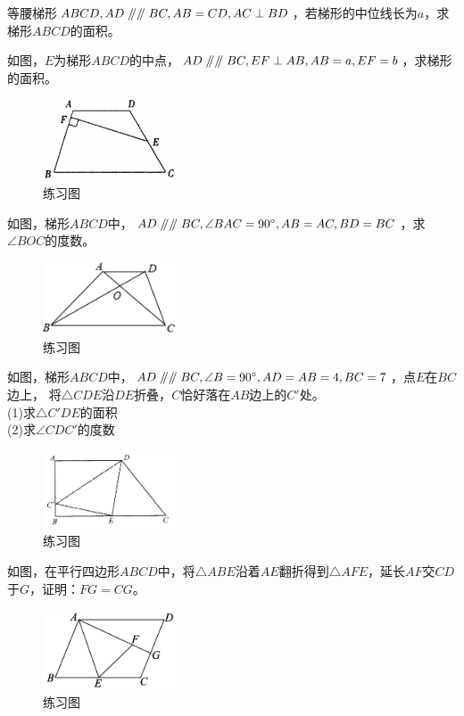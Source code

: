 \documentclass{ecnuthesis}
\newcommand\px{\mathrel{/\mkern-5mu/}}  %
\begin{document}
\begin{problem}
    等腰梯形$ABCD,AD\px \px BC,AB=CD,AC\perp BD$，若梯形的中位线长为$a$，求梯形$ABCD$的面积。
\end{problem}
\begin{problem}
    如图，$E$为梯形$ABCD$的中点，$AD\px \px BC,EF\perp AB,AB=a,EF=b$，求梯形的面积。
\end{problem}
\begin{figure}[H]
\centering
\includegraphics[width=4cm]{picture/629.png}
\caption{练习图}
\end{figure}
\begin{problem}
    如图，梯形$ABCD$中，$AD\px\px BC,\angle BAC=90^\circ,AB=AC,BD=BC$，求$\angle BOC$的度数。
\end{problem}
\begin{figure}[H]
\centering
\includegraphics[width=4cm]{picture/636.png}
\caption{练习图}
\end{figure}
\begin{problem}
    如图，梯形$ABCD$中，$AD\px\px BC,\angle B=90^\circ,AD=AB=4,BC=7$，点$E$在$BC$边上，
    将$\triangle CDE$沿$DE$折叠，$C$恰好落在$AB$边上的$C'$处。 \\
    (1)求$\triangle C'DE$的面积 \\
    (2)求$\angle CDC'$的度数 \\
\end{problem}
\begin{figure}[H]
\centering
\includegraphics[width=4cm]{picture/637.png}
\caption{练习图}
\end{figure}

\begin{problem}
    如图，在平行四边形$ABCD$中，将$\triangle ABE$沿着$AE$翻折得到$\triangle AFE$，延长$AF$交$CD$于$G$，证明：$FG=CG$。 \\
\end{problem}
\begin{figure}[H]
\centering
\includegraphics[width=4cm]{picture/638.png}
\caption{练习图}
\end{figure}
\end{document}
